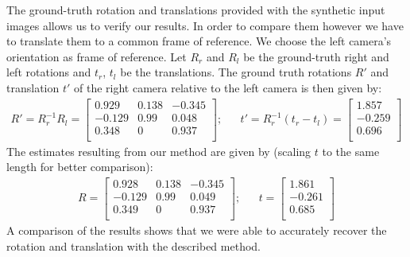 \documentclass{paper}
\begin{document}
The ground-truth rotation and translations provided with the synthetic input images allows us to verify our results. In order to compare them however we have to translate them to a common frame of reference. We choose the left camera's orientation as frame of reference. Let $R_r$ and $R_l$ be the ground-truth right and left rotations and $t_r$, $t_l$ be the translations. The ground truth rotations $R'$ and translation $t'$ of the right camera relative to the left camera is then given by:
\begin{align}
R' = R_r^{-1}R_l = \left[ \begin{array}{ccc}
0.929 & 0.138 & -0.345 \\
-0.129 & 0.99 & 0.048 \\
0.348 & 0 & 0.937 \\
\end{array} \right]; \nonumber 
&& t'= R_r^{-1}(t_r-t_l) = \left[ \begin{array}{c}
1.857\\
-0.259 \\
0.696 \\
\end{array} \right] \nonumber 
\end{align}
The estimates resulting from our method are given by (scaling $t$ to the same length for better comparison):
\begin{align}
R = \left[ \begin{array}{ccc}
0.928 & 0.138 & -0.345 \\
-0.129 & 0.99 & 0.049 \\
0.349 & 0 & 0.937 \\
\end{array} \right]; \nonumber 
&& t= \left[ \begin{array}{c}
1.861\\
-0.261 \\
0.685 \\
\end{array} \right] \nonumber 
\end{align}
A comparison of the results shows that we were able to accurately recover the rotation and translation with the described method.
\end{document}

